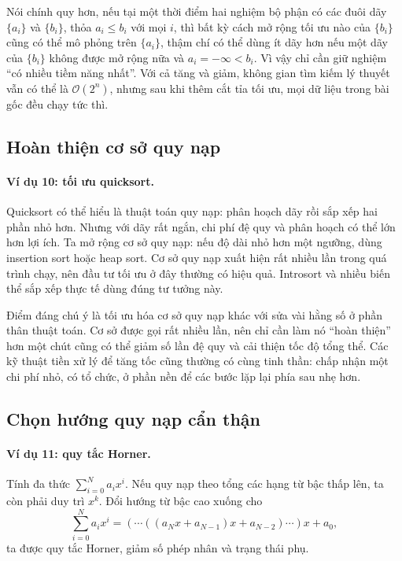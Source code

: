 \documentclass[11pt]{article}
\newcommand{\Oh}{\mathcal{O}}
\begin{document}
Nói chính quy hơn, nếu tại một thời điểm hai nghiệm bộ phận có các đuôi dãy
\(\{a_i\}\) và \(\{b_i\}\), thỏa \(a_i\le b_i\) với mọi \(i\), thì bất kỳ
cách mở rộng tối ưu nào của \(\{b_i\}\) cũng có thể mô phỏng trên
\(\{a_i\}\), thậm chí có thể dùng ít dãy hơn nếu một dãy của \(\{b_i\}\)
không được mở rộng nữa và \(a_i=-\infty<b_i\). Vì vậy chỉ cần giữ nghiệm
``có nhiều tiềm năng nhất''. Với cả tăng và giảm, không gian tìm kiếm lý
thuyết vẫn có thể là \(\Oh(2^n)\), nhưng sau khi thêm cắt tỉa tối ưu, mọi dữ
liệu trong bài gốc đều chạy tức thì.

\subsection{Hoàn thiện cơ sở quy nạp}

\paragraph{Ví dụ 10: tối ưu quicksort.}
Quicksort có thể hiểu là thuật toán quy nạp: phân hoạch dãy rồi sắp xếp hai
phần nhỏ hơn. Nhưng với dãy rất ngắn, chi phí đệ quy và phân hoạch có thể lớn
hơn lợi ích. Ta mở rộng cơ sở quy nạp: nếu độ dài nhỏ hơn một ngưỡng, dùng
insertion sort hoặc heap sort. Cơ sở quy nạp xuất hiện rất nhiều lần trong
quá trình chạy, nên đầu tư tối ưu ở đây thường có hiệu quả. Introsort và nhiều
biến thể sắp xếp thực tế dùng đúng tư tưởng này.

Điểm đáng chú ý là tối ưu hóa cơ sở quy nạp khác với sửa vài hằng số ở phần
thân thuật toán. Cơ sở được gọi rất nhiều lần, nên chỉ cần làm nó ``hoàn thiện''
hơn một chút cũng có thể giảm số lần đệ quy và cải thiện tốc độ tổng thể. Các
kỹ thuật tiền xử lý để tăng tốc cũng thường có cùng tinh thần: chấp nhận một
chi phí nhỏ, có tổ chức, ở phần nền để các bước lặp lại phía sau nhẹ hơn.

\subsection{Chọn hướng quy nạp cẩn thận}

\paragraph{Ví dụ 11: quy tắc Horner.}
Tính đa thức \(\sum_{i=0}^{N} a_i x^i\). Nếu quy nạp theo tổng các hạng từ
bậc thấp lên, ta còn phải duy trì \(x^k\). Đổi hướng từ bậc cao xuống cho
\[
  \sum_{i=0}^{N}a_i x^i
  =(\cdots((a_Nx+a_{N-1})x+a_{N-2})\cdots)x+a_0,
\]
ta được quy tắc Horner, giảm số phép nhân và trạng thái phụ.
\end{document}
